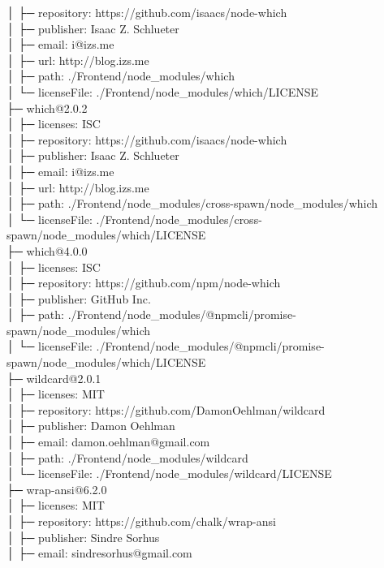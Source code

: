 │  ├─ repository: https://github.com/isaacs/node-which\\
│  ├─ publisher: Isaac Z. Schlueter\\
│  ├─ email: i@izs.me\\
│  ├─ url: http://blog.izs.me\\
│  ├─ path: ./Frontend/node\_modules/which\\
│  └─ licenseFile: ./Frontend/node\_modules/which/LICENSE\\
├─ which@2.0.2\\
│  ├─ licenses: ISC\\
│  ├─ repository: https://github.com/isaacs/node-which\\
│  ├─ publisher: Isaac Z. Schlueter\\
│  ├─ email: i@izs.me\\
│  ├─ url: http://blog.izs.me\\
│  ├─ path: ./Frontend/node\_modules/cross-spawn/node\_modules/which\\
│  └─ licenseFile: ./Frontend/node\_modules/cross-spawn/node\_modules/which/LICENSE\\
├─ which@4.0.0\\
│  ├─ licenses: ISC\\
│  ├─ repository: https://github.com/npm/node-which\\
│  ├─ publisher: GitHub Inc.\\
│  ├─ path: ./Frontend/node\_modules/@npmcli/promise-spawn/node\_modules/which\\
│  └─ licenseFile: ./Frontend/node\_modules/@npmcli/promise-spawn/node\_modules/which/LICENSE\\
├─ wildcard@2.0.1\\
│  ├─ licenses: MIT\\
│  ├─ repository: https://github.com/DamonOehlman/wildcard\\
│  ├─ publisher: Damon Oehlman\\
│  ├─ email: damon.oehlman@gmail.com\\
│  ├─ path: ./Frontend/node\_modules/wildcard\\
│  └─ licenseFile: ./Frontend/node\_modules/wildcard/LICENSE\\
├─ wrap-ansi@6.2.0\\
│  ├─ licenses: MIT\\
│  ├─ repository: https://github.com/chalk/wrap-ansi\\
│  ├─ publisher: Sindre Sorhus\\
│  ├─ email: sindresorhus@gmail.com\\
